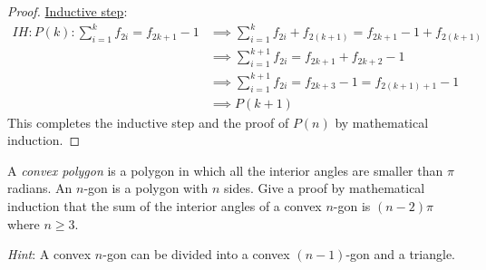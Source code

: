 \documentclass[a4paper]{exam}
\begin{document}
\begin{questions}
\begin{parts}
\begin{solution}
\begin{proof}
      \underline{Inductive step}:\\
      \begin{align*}
        IH: P(k): \sum_{i=1}^k f_{2i} = f_{2k+1} - 1 &\implies \sum_{i=1}^k f_{2i}  +f_{2(k+1)}= f_{2k+1} - 1 +f_{2(k+1)}\\
                                                     &\implies \sum_{i=1}^{k+1} f_{2i} = f_{2k+1} +f_{2k+2} - 1\\
                                                     &\implies \sum_{i=1}^{k+1} f_{2i}= f_{2k+3} - 1 = f_{2(k+1)+1} - 1\\
                                                     &\implies P(k+1)
      \end{align*}
      This completes the inductive step and the proof of $P(n)$ by mathematical induction.
      \end{proof}
    \end{solution}
  \end{parts}

\question A \textit{convex polygon} is a polygon in which all the interior angles are smaller than $\pi$ radians. An $n$-gon is a polygon with $n$ sides. Give a proof by mathematical induction that the sum of the interior angles of a convex $n$-gon is $(n-2)\pi$ where $n\ge 3$. 

  \textit{Hint}: A convex $n$-gon can be divided into a convex $(n-1)$-gon and a triangle.
  \begin{solution}
  \end{solution}
  

\end{questions}
\end{document}
